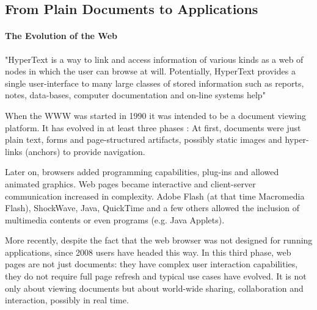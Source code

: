 
%
%

\subsection{From Plain Documents to Applications}
\paragraph{The Evolution of the Web}
"HyperText is a way to link and access information of various kinds as a web of nodes in which the user can browse at will. Potentially, HyperText provides a single user-interface to many large classes of stored information such as reports, notes, data-bases, computer documentation and on-line systems help" \cite{BernersLee:1990}

When the \ac{WWW} was started in 1990 it was intended to be a document viewing platform. It has evolved in at least three phases \cite{Anttonen:2011} \cite{Taivalsaari:2008}:
At first, documents were just plain text, forms and page-structured artifacts, possibly static images and hyper-links (anchors) to provide navigation. 

Later on, browsers added programming capabilities, plug-ins and allowed animated graphics. Web pages became interactive and client-server communication increased in complexity.
Adobe Flash (at that time Macromedia Flash), ShockWave, Java, QuickTime and a few others allowed the inclusion of multimedia contents or even programs (e.g. Java Applets).

More recently, despite the fact that the web browser was not designed for running applications, since 2008 users have headed this way. 
In this third phase, web pages are not just documents: they have complex user interaction capabilities, they do not require full page refresh and typical use cases have evolved. 
It is not only about viewing documents but about world-wide sharing, collaboration and interaction, possibly in real time. 

